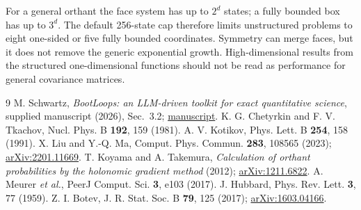 \documentclass[aps,pra,onecolumn,11pt,tightenlines,notitlepage,nofootinbib]{revtex4-2}
\begin{document}
For a general orthant the face system has up to $2^d$ states; a fully
bounded box has up to $3^d$. The default 256-state cap therefore limits
unstructured problems to eight one-sided or five fully bounded coordinates.
Symmetry can merge faces, but it does not remove the generic exponential
growth. High-dimensional results from the structured one-dimensional
functions should not be read as performance for general covariance matrices.

\begin{thebibliography}{9}
 M. Schwartz, \emph{BootLoops: an LLM-driven toolkit for exact quantitative science}, supplied manuscript (2026), Sec.~3.2; \href{https://bootloops.ai/BootLoops.pdf}{manuscript}.
 K. G. Chetyrkin and F. V. Tkachov, Nucl. Phys. B \textbf{192}, 159 (1981).
 A. V. Kotikov, Phys. Lett. B \textbf{254}, 158 (1991).
 X. Liu and Y.-Q. Ma, Comput. Phys. Commun. \textbf{283}, 108565 (2023); \href{https://arxiv.org/abs/2201.11669}{arXiv:2201.11669}.
 T. Koyama and A. Takemura, \emph{Calculation of orthant probabilities by the holonomic gradient method} (2012); \href{https://arxiv.org/abs/1211.6822}{arXiv:1211.6822}.
 A. Meurer \emph{et al.}, PeerJ Comput. Sci. \textbf{3}, e103 (2017).
 J. Hubbard, Phys. Rev. Lett. \textbf{3}, 77 (1959).
 Z. I. Botev, J. R. Stat. Soc. B \textbf{79}, 125 (2017); \href{https://arxiv.org/abs/1603.04166}{arXiv:1603.04166}.
\end{thebibliography}
\end{document}
